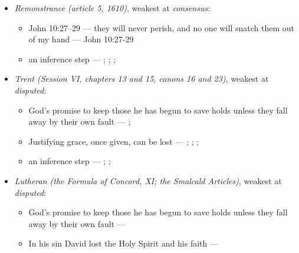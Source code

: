 \documentclass[11pt]{article}
\begin{document}
\begin{itemize}
\begin{itemize}
\item To some whom God has regenerated, and given faith, hope and love, he does not give perseverance --- \cite[478]{npnf1-05-1887}; \cite[On Rebuke and Grace, ch. 18]{npnf1-05-1887}
\item 1 John 2:19, read of every apostate: all who fall away were never true believers (encoded as a denial, so it ranks disputed) --- \cite[479--480]{npnf1-05-1887}
\end{itemize}
\item \emph{Remonstrance (article 5, 1610)}, weakest at \emph{consensus}:
\begin{itemize}
\item John 10:27–29 — they will never perish, and no one will snatch them out of my hand --- John 10:27-29
\item an inference step --- \cite[548--549]{schaff-creeds-christendom-3-1977}; \cite[603]{arminius-works-1-1825}; \cite[Solid Declaration XI.45]{concordia-triglotta-1921}; \cite[444--445]{wesley-works-9-1827}
\end{itemize}
\item \emph{Trent (Session VI, chapters 13 and 15, canons 16 and 23)}, weakest at \emph{disputed}:
\begin{itemize}
\item God’s promise to keep those he has begun to save holds unless they fall away by their own fault --- \cite[Trent, Session VI (1547), ch. 13]{tanner-decrees-1990}; \cite[40]{waterworth-trent-1848}
\item Justifying grace, once given, can be lost --- \cite[Trent, Session VI (1547), ch. 15]{tanner-decrees-1990}; \cite[42]{waterworth-trent-1848}; \cite[Trent, Session VI (1547), canon 23]{tanner-decrees-1990}; \cite[47]{waterworth-trent-1848}
\item an inference step --- \cite[329--330]{calvin-corinthians-1-1848}; \cite[Trent, Session VI (1547), ch. 13]{tanner-decrees-1990}; \cite[40--41]{waterworth-trent-1848}
\end{itemize}
\item \emph{Lutheran (the Formula of Concord, XI; the Smalcald Articles)}, weakest at \emph{disputed}:
\begin{itemize}
\item God’s promise to keep those he has begun to save holds unless they fall away by their own fault --- \cite[Solid Declaration XI.42]{concordia-triglotta-1921}
\item In his sin David lost the Holy Spirit and his faith --- \cite[Smalcald Articles III.iii.43]{concordia-triglotta-1921}

\end{itemize}
\end{itemize}
\end{document}
